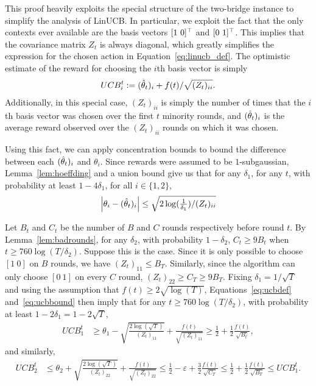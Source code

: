   This proof heavily exploits the special structure of the two-bridge
  instance to simplify the analysis of LinUCB.  In particular, we
  exploit the fact that the only contexts ever available are the basis
  vectors $[1 ~ 0]^{\top}$ and $[0 ~ 1]^{\top}$.  This implies that the
  covariance matrix $Z_t$ is always diagonal, which greatly simplifies
  the expression for the chosen action in
  Equation~\eqref{eq:linucb_def}.  The optimistic estimate of the
  reward for choosing the $i$th basis vector is simply
  \begin{align}
    UCB_i^t := (\hat{\theta}_t)_i + f(t)/\sqrt{(Z_t)_{ii}} .
    \label{eq:ucbdef}
  \end{align}
  Additionally, in this special case,  $(Z_t)_{ii}$ is simply the
  number of times that the $i$th basis vector was chosen over the
  first $t$ minority rounds, and $(\hat{\theta}_t)_i$ is the average reward
  observed over the $(Z_t)_{ii}$ rounds on which it was chosen.

  Using this fact, we can apply concentration bounds to bound the
  difference between each $(\hat{\theta}_t)_i$ and $\theta_i$. Since rewards
  were assumed to be $1$-subgaussian,
  Lemma~\ref{lem:hoeffding} and a union bound give us that for any
  $\delta_1$, for any $t$, with probability at least $1-4\delta_1$, for all $i
  \in \{1,2\}$,
  \begin{align}
    \left\vert \theta_i - (\hat{\theta}_t)_i \right\vert \le
        \sqrt{2 \log (\tfrac{1}{\delta_1})/(Z_t)_{ii}}
  \label{eq:ucbbound}
\end{align}

Let $B_t$ and $C_t$ be the number of $B$ and $C$ rounds respectively
before round $t$. By Lemma~\ref{lem:badrounds}, for any $\delta_2$,
with probability $1-\delta_2$, $C_t \ge 9 B_t$ when
$t \ge 760 \log(T/\delta_2)$.  Suppose this is the case.  Since it is
only possible to choose $[1 ~ 0]$ on $B$ rounds, we have
$(Z_t)_{11} \leq B_T$. Similarly, since the algorithm can only choose
$[0 ~ 1]$ on every $C$ round, $(Z_t)_{22} \geq C_T \geq 9 B_T$.
Fixing $\delta_1 = 1/\sqrt{T}$ and using the assumption that
$f(t) \geq 2\sqrt{\log(T)}$, Equations~\eqref{eq:ucbdef}
and~\eqref{eq:ucbbound} then imply that for any $t \geq 760
\log(T/\delta_2)$, with probability at least $1-2\delta_1 = 1 -2\sqrt{T}$,
\begin{align*}
  UCB_1^{t}
  &\ge \theta_1 - \sqrt{\frac{2 \log (\sqrt T)}{(Z_t)_{11}}}+
  \frac{f(t)}{\sqrt{(Z_t)_{11}}}
  \ge \frac{1}{2} + \frac{1}{2}\frac{f(t)}{\sqrt{B_t}} ,
\end{align*}
and similarly,
\begin{align*}
  UCB_2^{t}
  &\le \theta_2 + \sqrt{\frac{2 \log (\sqrt{T})}{(Z_t)_{22}}} +
  \frac{f(t)}{\sqrt{(Z_t)_{22}}}
 \le \frac{1}{2} - \varepsilon   +\frac{3}{2}\frac{f(t)}{\sqrt{C_T}}
\le  \frac{1}{2} +\frac{1}{2}\frac{f(t)}{\sqrt{B_T}} \leq UCB_1^{t}.
\end{align*}


